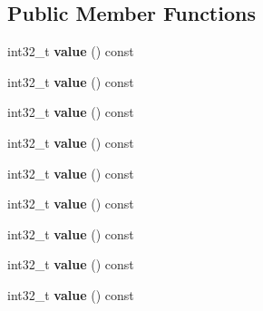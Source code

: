 \subsection*{Public Member Functions}
\begin{DoxyCompactItemize}
\item 
int32\+\_\+t {\bfseries value} () const \hypertarget{classv8_1_1internal_1_1_l_constant_i_a229bd9d3e8cba097dc36ab270a031a5f}{}\label{classv8_1_1internal_1_1_l_constant_i_a229bd9d3e8cba097dc36ab270a031a5f}

\item 
int32\+\_\+t {\bfseries value} () const \hypertarget{classv8_1_1internal_1_1_l_constant_i_a229bd9d3e8cba097dc36ab270a031a5f}{}\label{classv8_1_1internal_1_1_l_constant_i_a229bd9d3e8cba097dc36ab270a031a5f}

\item 
int32\+\_\+t {\bfseries value} () const \hypertarget{classv8_1_1internal_1_1_l_constant_i_a229bd9d3e8cba097dc36ab270a031a5f}{}\label{classv8_1_1internal_1_1_l_constant_i_a229bd9d3e8cba097dc36ab270a031a5f}

\item 
int32\+\_\+t {\bfseries value} () const \hypertarget{classv8_1_1internal_1_1_l_constant_i_a229bd9d3e8cba097dc36ab270a031a5f}{}\label{classv8_1_1internal_1_1_l_constant_i_a229bd9d3e8cba097dc36ab270a031a5f}

\item 
int32\+\_\+t {\bfseries value} () const \hypertarget{classv8_1_1internal_1_1_l_constant_i_a229bd9d3e8cba097dc36ab270a031a5f}{}\label{classv8_1_1internal_1_1_l_constant_i_a229bd9d3e8cba097dc36ab270a031a5f}

\item 
int32\+\_\+t {\bfseries value} () const \hypertarget{classv8_1_1internal_1_1_l_constant_i_a229bd9d3e8cba097dc36ab270a031a5f}{}\label{classv8_1_1internal_1_1_l_constant_i_a229bd9d3e8cba097dc36ab270a031a5f}

\item 
int32\+\_\+t {\bfseries value} () const \hypertarget{classv8_1_1internal_1_1_l_constant_i_a229bd9d3e8cba097dc36ab270a031a5f}{}\label{classv8_1_1internal_1_1_l_constant_i_a229bd9d3e8cba097dc36ab270a031a5f}

\item 
int32\+\_\+t {\bfseries value} () const \hypertarget{classv8_1_1internal_1_1_l_constant_i_a229bd9d3e8cba097dc36ab270a031a5f}{}\label{classv8_1_1internal_1_1_l_constant_i_a229bd9d3e8cba097dc36ab270a031a5f}

\item 
int32\+\_\+t {\bfseries value} () const \hypertarget{classv8_1_1internal_1_1_l_constant_i_a229bd9d3e8cba097dc36ab270a031a5f}{}\label{classv8_1_1internal_1_1_l_constant_i_a229bd9d3e8cba097dc36ab270a031a5f}

\end{DoxyCompactItemize}

